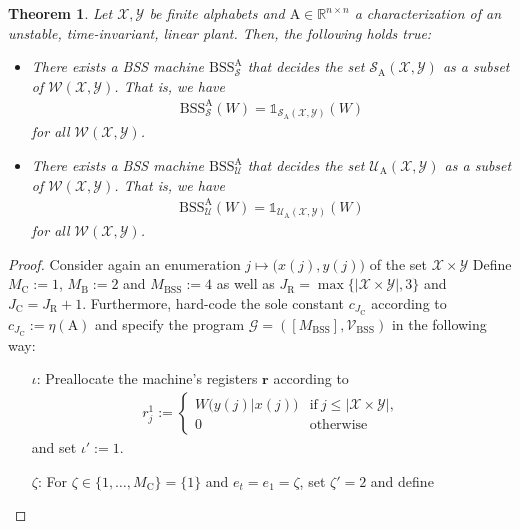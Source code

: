 \documentclass[conference]{IEEEtran}
\def\X{{\mathcal X}}
\def\Y{{\mathcal Y}}
\def\G{{\mathcal G}}
\def\V{{\mathcal V}}
\def\W{{\mathcal W}}
\def\S{{\mathcal S}}
\def\U{{\mathcal U}}
\def\RR{{\mathbb R}}
\def\mA{\bm{\mathrm{A}}}
\newcommand{\BSS}{\mathrm{BSS}}
\newtheorem{Theorem}{Theorem}
\begin{document}
	\begin{Theorem}	\label{thm:RemoteStateEstimationBSSDecidable}
					Let \(\X,\Y\) be finite alphabets and \(\mA \in \RR^{n\times n}\) a characterization of an unstable, time-invariant, 
					linear plant. Then, the following holds true:
					\begin{itemize}	\item There exists a BSS machine \(\BSS_{\S}^{\mA}\) that \emph{decides} the set
										\(\S_{\mA}(\X,\Y)\) as a subset of \(\W(\X,\Y)\). That is, we have
										\begin{align*}	\BSS_{\S}^{\mA}(W) = 	\mathds{1}_{\S_{\mA}(\X,\Y)}(W)
										\end{align*}
										for all \(\W(\X,\Y)\).
									\item There exists a BSS machine \(\BSS_{\U}^{\mA}\) that \emph{decides} the set
										\(\U_{\mA}(\X,\Y)\) as a subset of \(\W(\X,\Y)\). That is, we have
										\begin{align*}	\BSS_{\U}^{\mA}(W) = 	\mathds{1}_{\U_{\mA}(\X,\Y)}(W)
										\end{align*}
										for all \(\W(\X,\Y)\).
					\end{itemize}
	\end{Theorem}\begin{proof}
					Consider again an enumeration \(j \mapsto \big(x(j), y(j)\big)\) of the set \(\X\times\Y\) 
					Define \(M_\mathrm{C} := 1\), \(M_\mathrm{B} := 2\) and \(M_\BSS := 4\) as well as \(J_\mathrm{R} = \max\{|\X\times \Y|,3\}\) and 
					\(J_\mathrm{C} = J_\mathrm{R} + 1\). Furthermore, hard-code the sole constant \(c_{J_\mathrm{C}}\) according to
					\(c_{J_\mathrm{C} } := \eta(\mA)\) and specify the program \(\G = ([M_\BSS],\V_\BSS)\) in the following way:
					\begin{enumerate}	\item[\(\iota\)\hspace{1pt}:] Preallocate the machine's registers \(\bm{r}\) according to
											\begin{align}	r^1_j :=	\begin{cases}	W\big(y(j)|x(j)\big)	&\text{if}~ j\leq |\X\times\Y|,\\
																						0						&\text{otherwise}
																		\end{cases}
											\end{align}
											and set \(\iota' := 1\).
										\item[\(\zeta\)\hspace{1pt}:] For \(\zeta \in \{1,\ldots, M_\mathrm{C}\} = \{1\}\) and \(e_t = e_1 = \zeta\), set \(\zeta' = 2\) and define 

\end{enumerate}
\end{proof}
\end{document}
